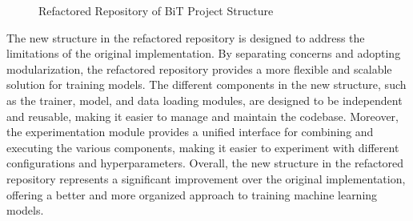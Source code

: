 \begin{figure}[H]
\centering
{}\caption{Refactored Repository of BiT Project Structure}
\end{figure}


The new structure in the refactored repository is designed to address the limitations of the original implementation. By separating concerns and adopting modularization, the refactored repository provides a more flexible and scalable solution for training models. The different components in the new structure, such as the trainer, model, and data loading modules, are designed to be independent and reusable, making it easier to manage and maintain the codebase. Moreover, the experimentation module provides a unified interface for combining and executing the various components, making it easier to experiment with different configurations and hyperparameters. Overall, the new structure in the refactored repository represents a significant improvement over the original implementation, offering a better and more organized approach to training machine learning models.


